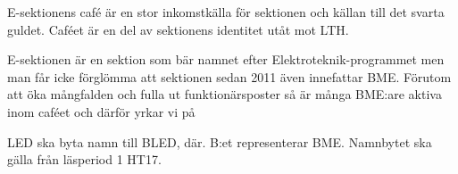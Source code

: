 \documentclass[../_main/handlingar.tex]{subfiles}
\begin{document}

E-sektionens café är en stor inkomstkälla för sektionen och källan till det svarta guldet. Caféet är en del av sektionens identitet utåt mot LTH.

E-sektionen är en sektion som bär namnet efter Elektroteknik-programmet men man får icke förglömma att sektionen sedan 2011 även innefattar BME. Förutom att öka mångfalden och fulla ut funktionärsposter så är många BME:are aktiva inom caféet och därför yrkar vi på

\begin{attsatser}
    \att LED ska byta namn till BLED, där. B:et representerar BME. Namnbytet ska gälla från läsperiod 1 HT17.
\end{attsatser}

\begin{signatures}{1}
    \mvh
    \signature{Godtycklig BME:are}{}
\end{signatures}
\end{document}

